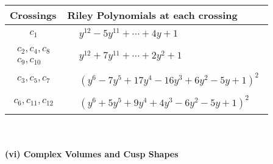 \documentclass[1p]{elsarticle_modified}
\theoremstyle{definition}
\begin{document}
\begin{tabular}{m{50pt}|m{274pt}}
Crossings & \hspace{64pt}Riley Polynomials at each crossing \\
\hline $$\begin{aligned}c_{1}\end{aligned}$$&$\begin{aligned}
&y^{12}-5 y^{11}+\cdots+4 y+1
\end{aligned}$\\
\hline $$\begin{aligned}c_{2},c_{4},c_{8}\\c_{9},c_{10}\end{aligned}$$&$\begin{aligned}
&y^{12}+7 y^{11}+\cdots+2 y^2+1
\end{aligned}$\\
\hline $$\begin{aligned}c_{3},c_{5},c_{7}\end{aligned}$$&$\begin{aligned}
&(y^6-7 y^5+17 y^4-16 y^3+6 y^2-5 y+1)^2
\end{aligned}$\\
\hline $$\begin{aligned}c_{6},c_{11},c_{12}\end{aligned}$$&$\begin{aligned}
&(y^6+5 y^5+9 y^4+4 y^3-6 y^2-5 y+1)^2
\end{aligned}$\\
\hline
\end{tabular}\\~\\
\newpage\flushleft \textbf{(vi) Complex Volumes and Cusp Shapes}
\end{document}
